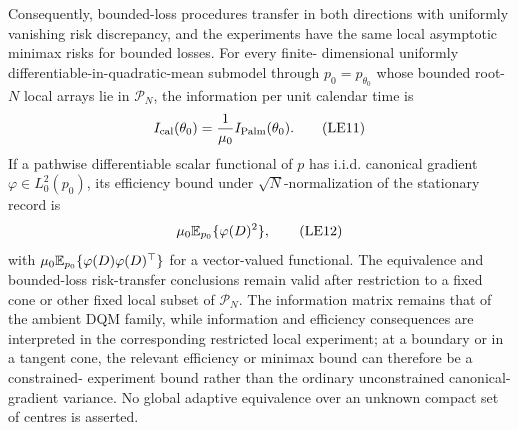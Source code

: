 \begin{theorem}
Consequently, bounded-loss procedures transfer in both directions with
uniformly vanishing risk discrepancy, and the experiments have the same
local asymptotic minimax risks for bounded losses.  For every finite-
dimensional uniformly differentiable-in-quadratic-mean submodel through
\(p_0=p_{\theta_0}\) whose bounded root-\(N\) local arrays lie in
\(\mathcal P_N\), the information per unit calendar time is
\[
 I_{\rm cal}(\theta_0)
 =\frac1{\mu_0}I_{\rm Palm}(\theta_0).
\tag{LE11}\label{eq:le11-main}
\]
If a pathwise differentiable scalar functional of \(p\) has i.i.d.
canonical gradient \(\varphi\in L_0^2(p_0)\), its efficiency bound under
\(\sqrt N\)-normalization of the stationary record is
\[
 \mu_0\mathbb E_{p_0}\{\varphi(D)^2\},
\tag{LE12}\label{eq:le12-main}
\]
with \(\mu_0\mathbb E_{p_0}\{\varphi(D)\varphi(D)^\top\}\) for a vector-valued
functional.  The equivalence and bounded-loss risk-transfer conclusions remain
valid after restriction to a fixed cone or other fixed local subset of
\(\mathcal P_N\).  The information matrix remains that of the ambient DQM
family, while information and efficiency consequences are interpreted in the
corresponding restricted local experiment; at a boundary or in a tangent cone,
the relevant efficiency or minimax bound can therefore be a constrained-
experiment bound rather than the ordinary unconstrained canonical-gradient
variance.  No global adaptive equivalence over an unknown compact set of
centres is asserted.
\end{theorem}

